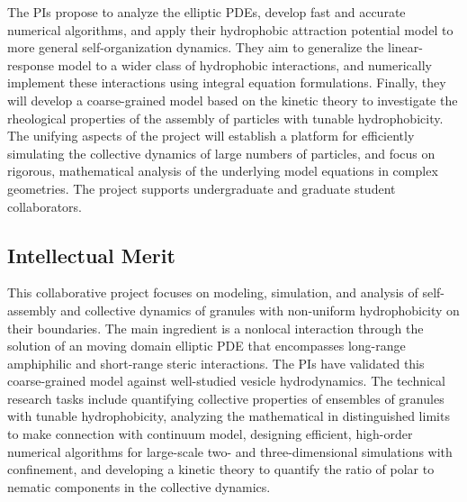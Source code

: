 \documentclass[10pt]{article}
\begin{document}
The PIs propose to analyze the elliptic PDEs, develop fast and accurate
numerical algorithms, and apply their hydrophobic attraction potential
model to more general self-organization dynamics. They aim to generalize
the linear-response model to a wider class of hydrophobic interactions,
and numerically implement these interactions using integral equation
formulations. Finally, they will develop a coarse-grained model based on
the kinetic theory to investigate the rheological properties of the
assembly of particles with tunable hydrophobicity. The unifying aspects
of the project will establish a platform for efficiently simulating
the collective dynamics of large numbers of particles, and focus on
rigorous, mathematical analysis of the underlying model equations in
complex geometries. The project supports undergraduate and graduate
student collaborators.

\subsection*{Intellectual Merit}
\vspace{-0.1in}
This collaborative project focuses on modeling, simulation, and analysis
of self-assembly and collective dynamics of granules with non-uniform hydrophobicity on their boundaries. The main
ingredient is a nonlocal interaction through the solution of an moving
domain elliptic PDE that encompasses long-range amphiphilic and
short-range steric interactions. The PIs have validated this
coarse-grained model against well-studied vesicle hydrodynamics. The
technical research tasks include quantifying collective properties of
ensembles of granules with tunable hydrophobicity, analyzing the mathematical in distinguished limits to make connection with continuum model,
designing efficient,
high-order numerical algorithms for large-scale two- and
three-dimensional simulations with confinement, and developing a kinetic
theory to quantify the ratio of polar to nematic components in the collective dynamics.

\end{document}

